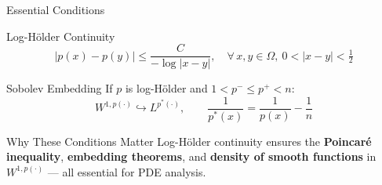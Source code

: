 \documentclass[11pt]{beamer}
\let\oldcite\cite
\renewcommand{\cite}[1]{\textcolor{red}{\textbf{\oldcite{#1}}}}
\begin{document}
	\begin{frame}{Essential Conditions \cite{diening2011}}
		\begin{block}{Log-Hölder Continuity}
			\[
			|p(x) - p(y)| \le \frac{C}{-\log|x-y|}, \quad \forall\, x, y \in \Omega,\ 0 < |x-y| < \tfrac{1}{2}
			\]
		\end{block}
		
		\begin{block}{Sobolev Embedding}
			If $p$ is log-Hölder and $1 < p^- \le p^+ < n$:
			\[
			W^{1, p(\cdot)} \hookrightarrow L^{p^*(\cdot)}, \qquad \frac{1}{p^*(x)} = \frac{1}{p(x)} - \frac{1}{n}
			\]
		\end{block}
		
		\begin{alertblock}{Why These Conditions Matter}
			Log-Hölder continuity ensures the \textbf{Poincaré inequality}, \textbf{embedding theorems}, and \textbf{density of smooth functions} in $W^{1, p(\cdot)}$ — all essential for PDE analysis.
		\end{alertblock}
	\end{frame}
	
\end{document}
